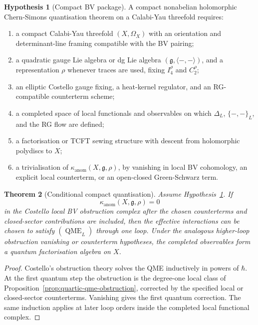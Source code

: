 \documentclass[11pt]{amsart}
\providecommand{\gfrak}{\mathfrak{g}}
\providecommand{\QME}{\operatorname{QME}}
\providecommand{\kanom}{\kappa_{\operatorname{anom}}}
\theoremstyle{plain}
\newtheorem{theorem}{Theorem}[section]
\theoremstyle{definition}
\newtheorem{hypothesis}[theorem]{Hypothesis}
\theoremstyle{remark}
\begin{document}
\begin{hypothesis}[Compact BV package]
\label{hyp:compact-bv-package}
A compact nonabelian holomorphic Chern-Simons quantisation theorem on a
Calabi-Yau threefold requires:
\begin{enumerate}
\item a compact Calabi-Yau threefold \((X,\Omega_X)\) with an
orientation and determinant-line framing compatible with the BV pairing;
\item a quadratic gauge Lie algebra or dg Lie algebra
\((\gfrak,\langle-,-\rangle)\), and a representation \(\rho\) whenever
traces are used, fixing \(I_4^\rho\) and \(C_2^\rho\);
\item an elliptic Costello gauge fixing, a heat-kernel regulator, and
an RG-compatible counterterm scheme;
\item a completed space of local functionals and observables on which
\(\Delta_L\), \(\{-,-\}_L\), and the RG flow are defined;
\item a factorisation or TCFT sewing structure with descent from
holomorphic polydiscs to \(X\);
\item a trivialisation of \(\kanom(X,\gfrak,\rho)\), by vanishing in
local BV cohomology, an explicit local counterterm, or an open-closed
Green-Schwarz term.
\end{enumerate}
\end{hypothesis}

\begin{theorem}[Conditional compact quantisation]
\label{thm:conditional-compact-quantisation}
Assume Hypothesis~\ref{hyp:compact-bv-package}.  If
\[
  \kanom(X,\gfrak,\rho)=0
\]
in the Costello local BV obstruction complex after the chosen
counterterms and closed-sector contributions are included, then the
effective interactions can be chosen to satisfy \((\QME_L)\) through
one loop.  Under the analogous higher-loop obstruction vanishing or
counterterm hypotheses, the completed observables form a quantum
factorisation algebra on \(X\).
\end{theorem}

\begin{proof}
Costello's obstruction theory solves the QME inductively in powers of
\(\hbar\).  At the first quantum step the obstruction is the degree-one
local class of Proposition~\ref{prop:quartic-qme-obstruction}, corrected
by the specified local or closed-sector counterterms.  Vanishing gives
the first quantum correction.  The same induction applies at later loop
orders inside the completed local functional complex.
\end{proof}
\end{document}
